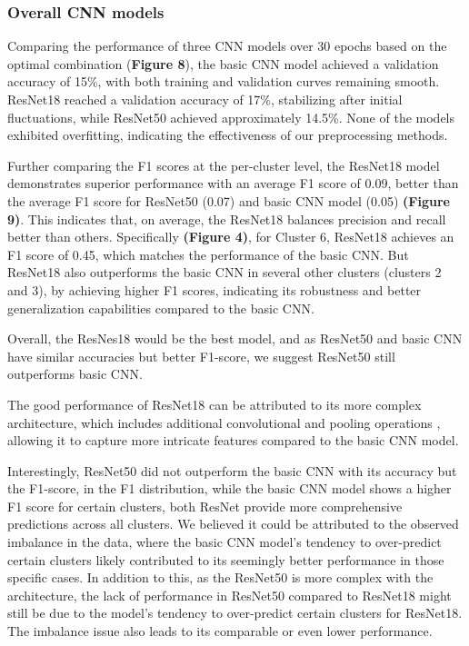 \documentclass[letterpaper,9pt,twocolumn,twoside,]{pinp}
\begin{document}
\hypertarget{overall-cnn-models}{%
\subsubsection{Overall CNN models}\label{overall-cnn-models}}

Comparing the performance of three CNN models over 30 epochs based on
the optimal combination (\textbf{Figure 8}), the basic CNN model
achieved a validation accuracy of 15\%, with both training and
validation curves remaining smooth. ResNet18 reached a validation
accuracy of 17\%, stabilizing after initial fluctuations, while ResNet50
achieved approximately 14.5\%. None of the models exhibited overfitting,
indicating the effectiveness of our preprocessing methods.

Further comparing the F1 scores at the per-cluster level, the ResNet18
model demonstrates superior performance with an average F1 score of
0.09, better than the average F1 score for ResNet50 (0.07) and basic CNN
model (0.05) \textbf{(Figure 9)}. This indicates that, on average, the
ResNet18 balances precision and recall better than others. Specifically
\textbf{(Figure 4)}, for Cluster 6, ResNet18 achieves an F1 score of
0.45, which matches the performance of the basic CNN. But ResNet18 also
outperforms the basic CNN in several other clusters (clusters 2 and 3),
by achieving higher F1 scores, indicating its robustness and better
generalization capabilities compared to the basic CNN.

Overall, the ResNes18 would be the best model, and as ResNet50 and basic
CNN have similar accuracies but better F1-score, we suggest ResNet50
still outperforms basic CNN.

The good performance of ResNet18 can be attributed to its more complex
architecture, which includes additional convolutional and pooling
operations \citep{article}, allowing it to capture more intricate
features compared to the basic CNN model.

Interestingly, ResNet50 did not outperform the basic CNN with its
accuracy but the F1-score, in the F1 distribution, while the basic CNN
model shows a higher F1 score for certain clusters, both ResNet provide
more comprehensive predictions across all clusters. We believed it could
be attributed to the observed imbalance in the data, where the basic CNN
model's tendency to over-predict certain clusters likely contributed to
its seemingly better performance in those specific cases. In addition to
this, as the ResNet50 is more complex with the architecture, the lack of
performance in ResNet50 compared to ResNet18 might still be due to the
model's tendency to over-predict certain clusters for ResNet18. The
imbalance issue also leads to its comparable or even lower performance.
\end{document}
